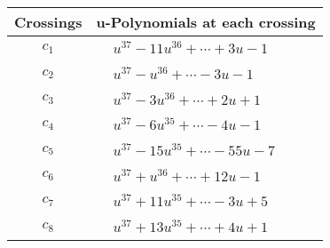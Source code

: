\documentclass[1p]{elsarticle_modified}
\theoremstyle{definition}
\begin{document}
\begin{tabular}{m{50pt}|m{274pt}}
Crossings & \hspace{64pt}u-Polynomials at each crossing \\
\hline $$\begin{aligned}c_{1}\end{aligned}$$&$\begin{aligned}
&u^{37}-11 u^{36}+\cdots+3 u-1
\end{aligned}$\\
\hline $$\begin{aligned}c_{2}\end{aligned}$$&$\begin{aligned}
&u^{37}- u^{36}+\cdots-3 u-1
\end{aligned}$\\
\hline $$\begin{aligned}c_{3}\end{aligned}$$&$\begin{aligned}
&u^{37}-3 u^{36}+\cdots+2 u+1
\end{aligned}$\\
\hline $$\begin{aligned}c_{4}\end{aligned}$$&$\begin{aligned}
&u^{37}-6 u^{35}+\cdots-4 u-1
\end{aligned}$\\
\hline $$\begin{aligned}c_{5}\end{aligned}$$&$\begin{aligned}
&u^{37}-15 u^{35}+\cdots-55 u-7
\end{aligned}$\\
\hline $$\begin{aligned}c_{6}\end{aligned}$$&$\begin{aligned}
&u^{37}+u^{36}+\cdots+12 u-1
\end{aligned}$\\
\hline $$\begin{aligned}c_{7}\end{aligned}$$&$\begin{aligned}
&u^{37}+11 u^{35}+\cdots-3 u+5
\end{aligned}$\\
\hline $$\begin{aligned}c_{8}\end{aligned}$$&$\begin{aligned}
&u^{37}+13 u^{35}+\cdots+4 u+1
\end{aligned}$\\

\end{tabular}
\end{document}
